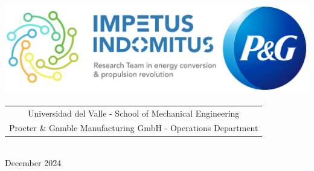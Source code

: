 \begin{titlepage}
\begin{center}
         \vspace{1 cm}
        
        {\includegraphics[height=40mm]{LOGOS/LogoImpetusIndomitusPG.png}}\\

        \vspace{0.5 cm}
        {\begin{tabular}{c} Universidad del Valle - School of Mechanical Engineering \\ Procter \& Gamble Manufacturing GmbH - Operations Department \end{tabular}}\\
        December 2024        
    \end{center}
\end{titlepage}

